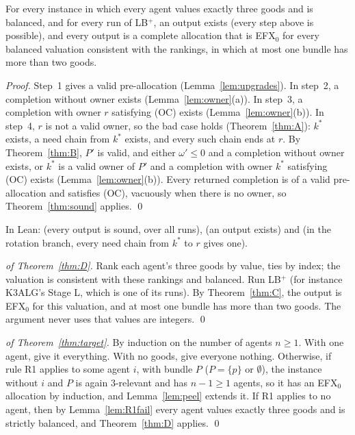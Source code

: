 \documentclass[runningheads,11pt]{llncs}
\newcommand{\efxz}{\texorpdfstring{\mbox{EFX$_0$}}{EFX0}}
\newcommand{\LBp}{\texorpdfstring{\mbox{LB$^{+}$}}{LB+}}
\begin{document}
\begin{theorem}[\LBp{} never fails]\label{thm:C}
For every instance in which every agent values exactly three goods and is balanced, and for every run of \LBp{}, an output exists (every step above is possible), and every output is a complete allocation that is \efxz{} for every balanced valuation consistent with the rankings, in which at most one bundle has more than two goods.
\end{theorem}

\begin{proof}
Step~1 gives a valid pre-allocation (Lemma~\ref{lem:upgrades}). In step~2, a completion without owner exists (Lemma~\ref{lem:owner}(a)). In step~3, a completion with owner $r$ satisfying (OC) exists (Lemma~\ref{lem:owner}(b)). In step~4, $r$ is not a valid owner, so the bad case holds (Theorem~\ref{thm:A}): $k^*$ exists, a need chain from $k^*$ exists, and every such chain ends at $r$. By Theorem~\ref{thm:B}, $P'$ is valid, and either $\omega'\le0$ and a completion without owner exists, or $k^*$ is a valid owner of $P'$ and a completion with owner $k^*$ satisfying (OC) exists (Lemma~\ref{lem:owner}(b)). Every returned completion is of a valid pre-allocation and satisfies (OC), vacuously when there is no owner, so Theorem~\ref{thm:sound} applies. \qed
\end{proof}

\noindent In Lean:  (every output is sound, over all runs),  (an output exists) and  (in the rotation branch, every need chain from $k^*$ to $r$ gives one).

\begin{proof}[of Theorem~\ref{thm:D}]
Rank each agent's three goods by value, ties by index; the valuation is consistent with these rankings and balanced. Run \LBp{} (for instance K3ALG's Stage L, which is one of its runs). By Theorem~\ref{thm:C}, the output is \efxz{} for this valuation, and at most one bundle has more than two goods. The argument never uses that values are integers. \qed
\end{proof}

\begin{proof}[of Theorem~\ref{thm:target}]
By induction on the number of agents $n\ge1$. With one agent, give it everything. With no goods, give everyone nothing. Otherwise, if rule R1 applies to some agent $i$, with bundle $P$ ($P=\{p\}$ or $\emptyset$), the instance without $i$ and $P$ is again $3$-relevant and has $n-1\ge1$ agents, so it has an \efxz{} allocation by induction, and Lemma~\ref{lem:peel} extends it. If R1 applies to no agent, then by Lemma~\ref{lem:R1fail} every agent values exactly three goods and is strictly balanced, and Theorem~\ref{thm:D} applies. \qed
\end{proof}
\end{document}
